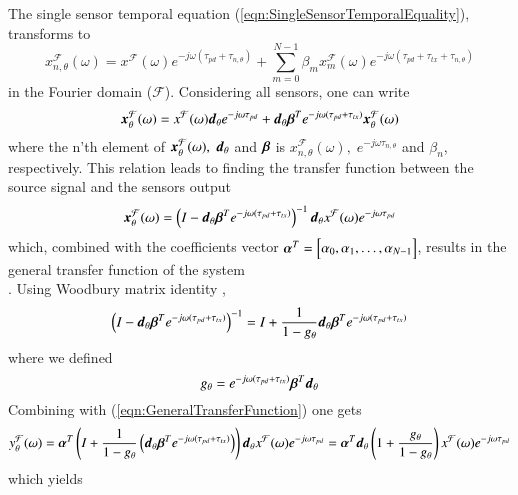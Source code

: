 The single sensor temporal equation (\ref{eqn:SingleSensorTemporalEquality}), transforms to 
$$ 
x_{n,\theta}^{\mathcal{F}}(\omega) = 
x^{\mathcal{F}}(\omega)
e^{-j\omega(\tau_{pd}+\tau_{n,\theta})}
+\sum_{m=0}^{N-1}
{
\beta_{m}x_{m}^{\mathcal{F}}(\omega)
e^{
-j\omega
(
\tau_{pd}
+\tau_{tx}
+\tau_{n,\theta}
)
}
} 
$$ 
in the Fourier domain (${\mathcal{F}} $). Considering all sensors, one can write
\begin{equation}
\boldsymbol{x}^{\mathcal{F}}_{\theta}(\omega) = 
x^{\mathcal{F}}(\omega)
\boldsymbol{d}_{\theta}
e^{-j\omega\tau_{pd}}
+
\boldsymbol{d}_{\theta}
\boldsymbol{\beta}^{T}
e^{-j\omega(\tau_{pd}+\tau_{tx})}
\boldsymbol{x}_{\theta}^{\mathcal{F}}(\omega)
\end{equation}
where the n'th element of 
$
\vecnot{x}_{\theta}^{\mathcal{F}}(\omega),
\; 
\vecnot{d}_{\theta}
$ 
and 
$
\vecnot{\beta}
$ 
is 
$x_{n,\theta}^{\mathcal{F}}(\omega),
\;
e^{-j\omega \tau_{n,\theta}}
$ 
and $\beta_n$, respectively.
This relation leads to finding the transfer function between the source signal and the sensors output
$$
\vecnot{x}^{\mathcal{F}}_{\theta}(\omega) 
= 
\left(
I-\vecnot{d}_{\theta}
\vecnot{\beta}^{T}
e^{-j\omega(\tau_{pd}+\tau_{tx})}
\right)
^{-1}
\vecnot{d}_{\theta}
x^{\mathcal{F}}(\omega)
e^{-j\omega\tau_{pd}}
$$
which, combined with the coefficients vector 
$ 
\vecnot{\alpha}^T = 
\begin{bmatrix}
    \alpha_{0},
    \alpha_{1},
    \ldots, 
    \alpha_{N-1}
\end{bmatrix}
$, 
results in the general transfer function of the system
\begin{equation}

\label{eqn:GeneralTransferFunction}
\end{equation}.
Using Woodbury matrix identity \cite{woodbury1950inverting}, 
$$
\left(
I-
\vecnot{d}_{\theta}
\vecnot{\beta}^{T}
e^{-j\omega(\tau_{pd}+\tau_{tx})}
\right)
^{-1}
=
I
+\frac{1}{1-g_{\theta}}
\vecnot{d}_{\theta}
\vecnot{\beta}^{T}
e^{-j\omega(\tau_{pd}+\tau_{tx})}
$$
where we defined
$$
g_{\theta}=e^{-j\omega(\tau_{pd}+\tau_{tx})}\vecnot{\beta}^{T}
\vecnot{d}_{\theta}
$$
Combining with (\ref{eqn:GeneralTransferFunction}) one gets
$$
y_{\theta}^{\mathcal{F}}(\omega) = 
\vecnot{\alpha}^{T}
\left(
I
+\frac{1}{1-g_{\theta}}
\left(
\vecnot{d}_{\theta}
\vecnot{\beta}^{T}
e^{-j\omega(\tau_{pd}+\tau_{tx})}
\right)
\right)
\vecnot{d}_{\theta}
x^{\mathcal{F}}(\omega)
e^{-j\omega\tau_{pd}}=
\vecnot{\alpha}^{T}\vecnot{d}_{\theta}
\left(
1
+\frac{g_{\theta}}{1-g_{\theta}}
\right)
x^{\mathcal{F}}(\omega)
e^{-j\omega\tau_{pd}}
$$
which yields
$$

$$
